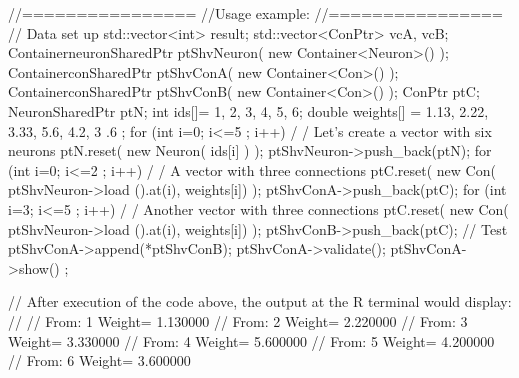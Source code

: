 \begin{DoxyCode}
        //================
        //Usage example:
        //================
        // Data set up
                                std::vector<int> result;
                                std::vector<ConPtr> vcA, vcB;
                                ContainerneuronSharedPtr ptShvNeuron( new 
      Container<Neuron>() );
                                ContainerconSharedPtr    ptShvConA( new 
      Container<Con>() );
                                ContainerconSharedPtr    ptShvConB( new 
      Container<Con>() );
                                ConPtr    ptC;
                                NeuronSharedPtr ptN;
                                int ids[]= {1, 2, 3, 4, 5, 6};
                                double weights[] = {1.13, 2.22, 3.33, 5.6, 4.2, 3
      .6 };
                                for (int i=0; i<=5 ; i++) {                             /
      / Let's create a vector with six neurons
                                        ptN.reset( new Neuron( ids[i] ) );
                                        ptShvNeuron->push_back(ptN);
                                }
                                for (int i=0; i<=2 ; i++) {                             /
      / A vector with three connections
                                        ptC.reset( new Con( ptShvNeuron->load
      ().at(i), weights[i]) );
                                        ptShvConA->push_back(ptC);
                                }
                                for (int i=3; i<=5 ; i++) {                             /
      / Another vector with three connections
                                        ptC.reset( new Con( ptShvNeuron->load
      ().at(i), weights[i]) );
                                        ptShvConB->push_back(ptC);
                                }
        // Test
                                ptShvConA->append(*ptShvConB);
                                ptShvConA->validate();
                                ptShvConA->show() ;

        // After execution of the code above, the output at the R terminal would 
      display:
        //
        //  From:        1       Weight=         1.130000
        //      From:    2       Weight=         2.220000
        //      From:    3       Weight=         3.330000
        //      From:    4       Weight=         5.600000
        //      From:    5       Weight=         4.200000
        //      From:    6       Weight=         3.600000
\end{DoxyCode}


